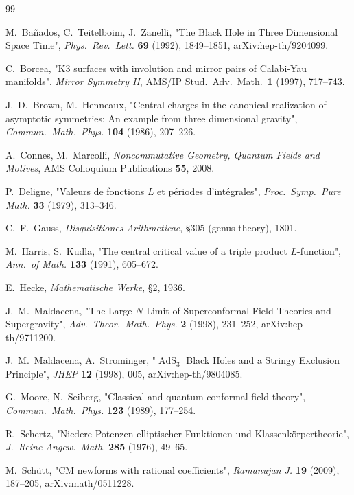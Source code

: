 \documentclass[11pt,a4paper]{amsart}
\theoremstyle{definition}
\DeclareMathOperator{\AdS}{AdS}
\begin{document}
\begin{thebibliography}{99}

M.\ Ba\~nados, C.\ Teitelboim, J.\ Zanelli,
"The Black Hole in Three Dimensional Space Time",
\emph{Phys.\ Rev.\ Lett.} \textbf{69} (1992), 1849--1851,
arXiv:hep-th/9204099.

C.\ Borcea,
"K3 surfaces with involution and mirror pairs of Calabi-Yau manifolds",
\emph{Mirror Symmetry II}, AMS/IP Stud.\ Adv.\ Math.\ \textbf{1} (1997), 717--743.

J.\ D.\ Brown, M.\ Henneaux,
"Central charges in the canonical realization of asymptotic symmetries: An example
from three dimensional gravity",
\emph{Commun.\ Math.\ Phys.} \textbf{104} (1986), 207--226.

A.\ Connes, M.\ Marcolli,
\emph{Noncommutative Geometry, Quantum Fields and Motives},
AMS Colloquium Publications \textbf{55}, 2008.

P.\ Deligne,
"Valeurs de fonctions $L$ et p\'eriodes d'int\'egrales",
\emph{Proc.\ Symp.\ Pure Math.} \textbf{33} (1979), 313--346.

C.\ F.\ Gauss,
\emph{Disquisitiones Arithmeticae},
\S 305 (genus theory), 1801.

M.\ Harris, S.\ Kudla,
"The central critical value of a triple product $L$-function",
\emph{Ann.\ of Math.} \textbf{133} (1991), 605--672.

E.\ Hecke,
\emph{Mathematische Werke}, \S 2, 1936.

J.\ M.\ Maldacena,
"The Large $N$ Limit of Superconformal Field Theories and Supergravity",
\emph{Adv.\ Theor.\ Math.\ Phys.} \textbf{2} (1998), 231--252,
arXiv:hep-th/9711200.

J.\ M.\ Maldacena, A.\ Strominger,
"$\AdS_3$ Black Holes and a Stringy Exclusion Principle",
\emph{JHEP} \textbf{12} (1998), 005,
arXiv:hep-th/9804085.

G.\ Moore, N.\ Seiberg,
"Classical and quantum conformal field theory",
\emph{Commun.\ Math.\ Phys.} \textbf{123} (1989), 177--254.

R.\ Schertz,
"Niedere Potenzen elliptischer Funktionen und Klassenk\"orpertheorie",
\emph{J.\ Reine Angew.\ Math.} \textbf{285} (1976), 49--65.

M.\ Sch\"utt,
"CM newforms with rational coefficients",
\emph{Ramanujan J.} \textbf{19} (2009), 187--205,
arXiv:math/0511228.


\end{thebibliography}
\end{document}
